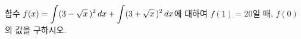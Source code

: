 함수 $f(x)=\displaystyle\int (3-\sqrt{x}\mkern3mu )^2\mkern3mu dx+\displaystyle\int (3+\sqrt{x}\mkern3mu )^2\mkern3mu dx$에 대하여 $f(1)=20$일 때, $f(0)$의 값을 구하시오.
